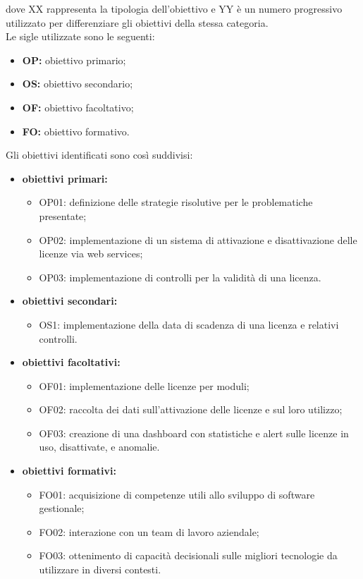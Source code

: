 dove XX rappresenta la tipologia dell'obiettivo e YY è un numero progressivo utilizzato per differenziare gli obiettivi della stessa categoria.
\\
Le sigle utilizzate sono le seguenti:

\begin{itemize}
\item \textbf{OP:} obiettivo primario;
\item \textbf{OS:} obiettivo secondario;
\item \textbf{OF:} obiettivo facoltativo;
\item \textbf{FO:} obiettivo formativo.
\end{itemize}

Gli obiettivi identificati sono così suddivisi:

\begin{itemize}

\item \textbf{obiettivi primari:}\begin{itemize}
\item OP01: definizione delle strategie risolutive per le problematiche presentate;
\item OP02: implementazione di un sistema di attivazione e disattivazione delle licenze via web services;
\item OP03: implementazione di controlli per la validità di una licenza.
\end{itemize}
\item \textbf{obiettivi secondari:}\begin{itemize}
\item OS1: implementazione della data di scadenza di una licenza e relativi controlli.
\end{itemize}
\item \textbf{obiettivi facoltativi:}\begin{itemize}
\item OF01: implementazione delle licenze per moduli;
\item OF02: raccolta dei dati sull’attivazione delle licenze e sul loro utilizzo;
\item OF03: creazione di una dashboard con statistiche e alert sulle licenze in uso, disattivate, e anomalie.
\end{itemize}
\item \textbf{obiettivi formativi:}\begin{itemize}
\item FO01: acquisizione di competenze utili allo sviluppo di software gestionale;
\item FO02: interazione con un team di lavoro aziendale;
\item FO03: ottenimento di capacità decisionali sulle migliori tecnologie da utilizzare in diversi contesti.
\end{itemize}

\end{itemize}

